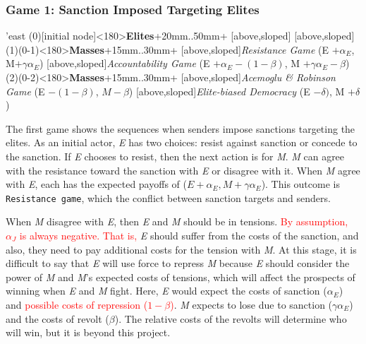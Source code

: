 \documentclass[11pt, letterpage]{article}
\begin{document}
\subsubsection*{Game 1: Sanction Imposed Targeting Elites}
\begin{center}
\begin{istgame}[font=\footnotesize]
	\centering
	\setistgrowdirection'{east}
	\xtShowArrows
	\istroot(0)[initial node]<180>{\textbf{Elites}}+20mm..50mm+
	[above,sloped]  [above,sloped] \endist
	\istroot(1)(0-1)<180>{\textbf{Masses}}+15mm..30mm+
	[above,sloped]{\textit{Resistance Game} (E $+ \alpha_{E}$, \: M$+\gamma$$\alpha_{E}$) }
	[above,sloped]{\textit{Accountability Game} (E $+ \alpha_{E}  - (1 - \beta)$,\: M $+ \gamma\alpha_{E} - \beta$)}  \endist
	\istroot(2)(0-2)<180>{\textbf{Masses}}+15mm..30mm+
	[above,sloped]{\textit{Acemoglu \& Robinson Game} (E $- (1 - \beta)$,\: $M-\beta$)}
	[above,sloped]{\textit{Elite-biased Democracy} (E $-\delta)$,\: M $+ \delta$)} \endist
\end{istgame}
\end{center}
	
The first game shows the sequences when senders impose sanctions targeting the elites. As an initial actor, \textit{E} has two choices: resist against sanction or concede to the sanction. If \textit{E} chooses to resist, then the next action is for \textit{M}. \textit{M} can agree with the resistance toward the sanction with \textit{E} or disagree with it. When \textit{M} agree with \textit{E}, each has the expected payoffs of ($E+\alpha_E, M+\gamma\alpha_{E}$). This outcome is \texttt{Resistance game}, which the conflict between sanction targets and senders.
	
When \textit{M} disagree with \textit{E}, then \textit{E} and \textit{M} should be in tensions. \textcolor{red}{By assumption, $\alpha_J$ is always negative. That is,} \textit{E} should suffer from the costs of the sanction, and also, they need to pay additional costs for the tension with \textit{M}. At this stage, it is difficult to say that \textit{E} will use force to repress \textit{M} because \textit{E} should consider the power of \textit{M} and \textit{M}'s expected costs of tensions, which will affect the prospects of winning when \textit{E} and \textit{M} fight. Here, \textit{E} would expect the costs of sanction ($\alpha_{E}$) and \textcolor{red}{possible costs of repression ($1-\beta$)}. \textit{M} expects to lose due to sanction ($\gamma\alpha_{E}$) and the costs of revolt ($\beta$). The relative costs of the revolts will determine who will win, but it is beyond this project.
	
\end{document}
